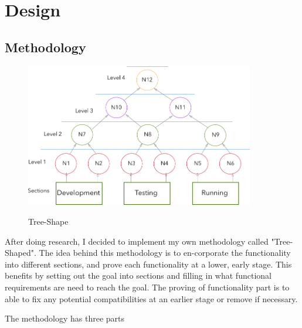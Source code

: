 \chapter{Design}

\section{Methodology}

\begin{figure}[!h]
    \caption{Tree-Shape}
    \centering
    \includegraphics[width=100mm]{images/methodology}
    \label{fig:label}
\end{figure}



After doing research, I decided to implement my own methodology called "Tree-Shaped". The idea behind this methodology is to en-corporate the functionality into different sections, and prove each functionality at a lower, early stage. This benefits by setting out the goal into sections and filling in what functional requirements are need to reach the goal. The proving of functionality part is to able to fix any potential compatibilities at an earlier stage or remove if necessary.

The methodology has three parts

